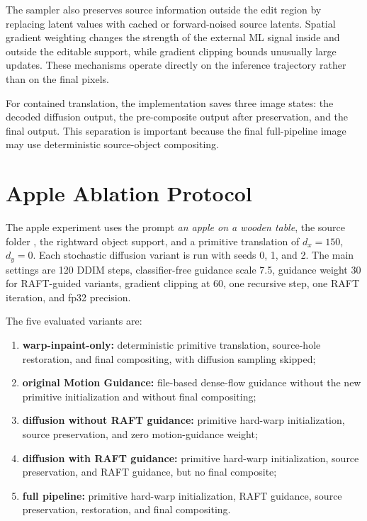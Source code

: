 The sampler also preserves source information outside the edit region by replacing latent values with cached or forward-noised source latents. Spatial gradient weighting changes the strength of the external ML signal inside and outside the editable support, while gradient clipping bounds unusually large updates. These mechanisms operate directly on the inference trajectory rather than on the final pixels.

For contained translation, the implementation saves three image states: the decoded diffusion output, the pre-composite output after preservation, and the final output. This separation is important because the final full-pipeline image may use deterministic source-object compositing.

\section{Apple Ablation Protocol}

The apple experiment uses the prompt \emph{an apple on a wooden table}, the source folder , the rightward object support, and a primitive translation of $d_x=150$, $d_y=0$. Each stochastic diffusion variant is run with seeds 0, 1, and 2. The main settings are 120 DDIM steps, classifier-free guidance scale 7.5, guidance weight 30 for RAFT-guided variants, gradient clipping at 60, one recursive step, one RAFT iteration, and fp32 precision.

The five evaluated variants are:

\begin{enumerate}
  \item \textbf{warp-inpaint-only:} deterministic primitive translation, source-hole restoration, and final compositing, with diffusion sampling skipped;
  \item \textbf{original Motion Guidance:} file-based dense-flow guidance without the new primitive initialization and without final compositing;
  \item \textbf{diffusion without RAFT guidance:} primitive hard-warp initialization, source preservation, and zero motion-guidance weight;
  \item \textbf{diffusion with RAFT guidance:} primitive hard-warp initialization, source preservation, and RAFT guidance, but no final composite;
  \item \textbf{full pipeline:} primitive hard-warp initialization, RAFT guidance, source preservation, restoration, and final compositing.
\end{enumerate}

